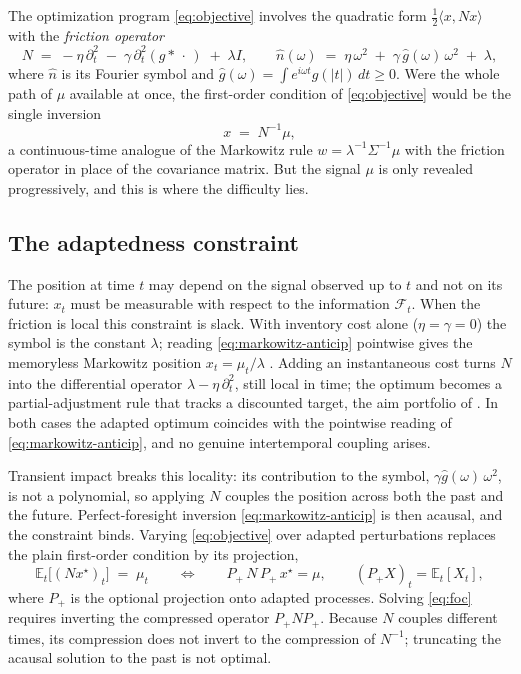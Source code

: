 \documentclass[11pt]{article}
\newcommand{\E}{\mathbb{E}}
\newcommand{\F}{\mathcal{F}}
\theoremstyle{plain}
\theoremstyle{definition}
\theoremstyle{remark}
\begin{document}
The optimization program \eqref{eq:objective} involves the quadratic form $\tfrac12\langle x,Nx\rangle$ with the \emph{friction operator}
\begin{equation}\label{eq:symbol}
N \;=\; -\eta\,\partial_t^2 \;-\; \gamma\,\partial_t^2(g\ast\,\cdot\,) \;+\; \lambda I,
\qquad
\hat n(\omega) \;=\; \eta\,\omega^2 \;+\; \gamma\,\hat g(\omega)\,\omega^2 \;+\; \lambda ,
\end{equation}
where $\hat n$ is its Fourier symbol and $\hat g(\omega)=\int e^{i\omega t}g(|t|)\,dt\ge0$. Were the whole path of $\mu$ available at once, the first-order condition of \eqref{eq:objective} would be the single inversion
\begin{equation}\label{eq:markowitz-anticip}
x \;=\; N^{-1}\mu ,
\end{equation}
a continuous-time analogue of the Markowitz rule $w=\lambda^{-1}\Sigma^{-1}\mu$ with the friction operator in place of the covariance matrix. But the signal $\mu$ is only revealed progressively, and this is where the difficulty lies.

\subsection{The adaptedness constraint}\label{sec:adaptedness}

The position at time $t$ may depend on the signal observed up to $t$ and not on its future: $x_t$ must be measurable with respect to the information $\F_t$. When the friction is local this constraint is slack. With inventory cost alone ($\eta=\gamma=0$) the symbol is the constant $\lambda$; reading \eqref{eq:markowitz-anticip} pointwise gives the memoryless Markowitz position $x_t=\mu_t/\lambda$ \citep{Markowitz1952,Merton1971}. Adding an instantaneous cost turns $N$ into the differential operator $\lambda-\eta\,\partial_t^2$, still local in time; the optimum becomes a partial-adjustment rule that tracks a discounted target, the aim portfolio of \citet{GarleanuPedersen2013,GarleanuPedersen2016}. In both cases the adapted optimum coincides with the pointwise reading of \eqref{eq:markowitz-anticip}, and no genuine intertemporal coupling arises.

Transient impact breaks this locality: its contribution to the symbol, $\gamma\hat g(\omega)\,\omega^2$, is not a polynomial, so applying $N$ couples the position across both the past and the future. Perfect-foresight inversion \eqref{eq:markowitz-anticip} is then acausal, and the constraint binds. Varying \eqref{eq:objective} over adapted perturbations replaces the plain first-order condition by its projection,
\begin{equation}\label{eq:foc}
\E_t\bigl[(Nx^\star)_t\bigr] \;=\; \mu_t
\qquad\Longleftrightarrow\qquad
P_+\,N\,P_+\,x^\star = \mu ,
\qquad (P_+X)_t = \E_t[X_t],
\end{equation}
where $P_+$ is the optional projection onto adapted processes. Solving \eqref{eq:foc} requires inverting the compressed operator $P_+NP_+$. Because $N$ couples different times, its compression does not invert to the compression of $N^{-1}$; truncating the acausal solution to the past is not optimal.
\end{document}
